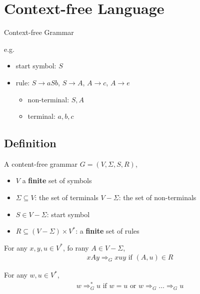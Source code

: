 \newpage
\section{Context-free Language}
Context-free Grammar

e.g. 
\begin{itemize}
    \item start symbol: $S$
    \item rule: $S \to aSb$, $S\to A$, $A\to c$, $A\to e$
    \begin{itemize}
        \item non-terminal: $S, A$
        \item terminal: $a,b,c$
    \end{itemize}
\end{itemize}

\subsection{Definition}

\begin{definition}
    A content-free grammar $G=(V,\Sigma, S, R)$,
    \begin{itemize}
        \item $V$ a \textbf{finite} set of symbols
        \item $\Sigma\subseteq V$: the set of terminals
        \subitem $V-\Sigma$: the set of non-terminals
        \item $S\in V-\Sigma$: start symbol
        \item $R\subseteq (V-\Sigma)\times V^*$: a \textbf{finite} set of rules
    \end{itemize}
\end{definition}

\begin{definition}
    For any $x,y,u \in V^*$, fo rany $A\in V-\Sigma$,
    \begin{align*}
        xAy\Rightarrow_G xuy \text{ if } (A,u)\in R
    \end{align*}
\end{definition}

\begin{definition}
    For any $w,u \in V^*$,
    \begin{align*}
        w\Rightarrow_G^*u \text{ if } w=u\text{ or }w\Rightarrow_G \dots \Rightarrow_G u
    \end{align*}
\end{definition}

